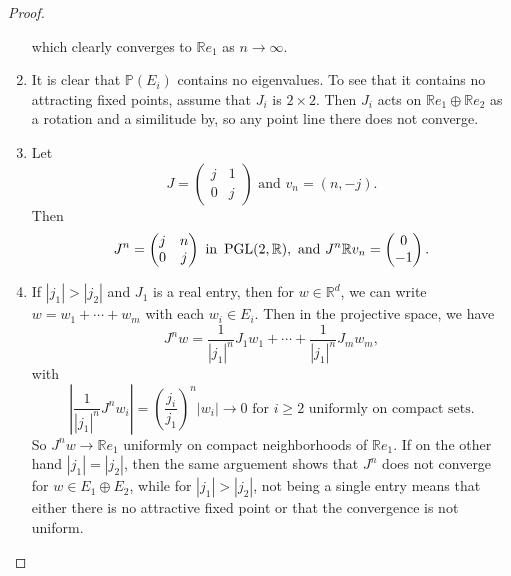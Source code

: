 \documentclass{report}
\begin{document}
\begin{lemma}
\begin{proof}
\begin{enumerate}[label=(\roman*)]
\[            \]
            which clearly converges to $\mathbb R e_1$ as $n \to \infty$.
            \item It is clear that $\mathbb P(E_i)$ contains no eigenvalues.
            To see that it contains no attracting fixed points, assume that $J_i$ is $2\times 2$.
            Then $J_i$ acts on $\mathbb R e_1 \oplus \mathbb R e_2$ as a rotation and a similitude by, so any point line there does not converge.
            \item Let 
            \[
            J = \begin{pmatrix}
                j & 1 \\
                0 & j
            \end{pmatrix} \text{ and } v_n = (n, -j).
            \]
            Then 
            \[
            J^n = \begin{pmatrix}
                j & n\\
                0 & j
                \end{pmatrix} \text{ in } \operatorname{{\mathrm{PGL}}}(2, \mathbb R), \text{ and } J^n \mathbb R v_n = \begin{pmatrix}
                    0\\
                    -1
                \end{pmatrix}.
            \]
            \item If $|j_1| > |j_2|$ and $J_1$ is a real entry, then for $w \in \mathbb R^d$, we can write $w = w_1 + \cdots + w_m$ with each $w_i \in E_i$.
            Then in the projective space, we have
            \[
            J^n w = \frac{1}{|j_1|^n} J_1 w_1 + \cdots + \frac{1}{|j_1|^n} J_m w_m,
            \]
            with
            \[
            |\frac{1}{|j_1|^n} J^n w_i| = \left(\frac{j_i}{j_1}\right)^n |w_i| \to 0 \text{ for } i \geq 2 \text{ uniformly on compact sets.}
            \]
            So $J^n w \to \mathbb R e_1$ uniformly on compact neighborhoods of $\mathbb R e_1$.
            If on the other hand $|j_1| = |j_2|$, then the same arguement shows that $J^n$ does not converge for $w \in E_1 \oplus E_2$, while for $|j_1| > |j_2|$, not being a single entry means that either there is no attractive fixed point or that the convergence is not uniform.
        \end{enumerate}
    \end{proof}
\end{lemma}
\end{document}
